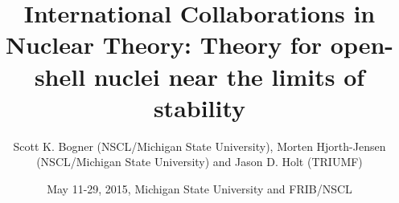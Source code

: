 \documentclass{beamer}
\begin{document}







\title{International Collaborations in Nuclear Theory: Theory for open-shell nuclei near the limits of stability}


\author{Scott K. Bogner (NSCL/Michigan State University), Morten Hjorth-Jensen (NSCL/Michigan State University) and Jason D. Holt (TRIUMF)\inst{}}
\institute{}


\date{May 11-29, 2015, Michigan State University and FRIB/NSCL
}

\begin{frame}
\titlepage
\end{frame}
\end{document}
